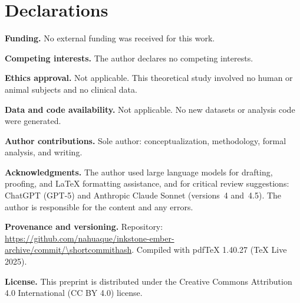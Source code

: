 \documentclass[11pt]{article}
\theoremstyle{upright}
\newcommand{\horizon}{\Lambda}
\newcommand{\commiturl}{\url{https://github.com/nahuaque/inkstone-ember-archive/commit/\shortcommithash}}
\begin{document}


\section*{Declarations}

\noindent\textbf{Funding.}
No external funding was received for this work.

\medskip
\noindent\textbf{Competing interests.}
The author declares no competing interests.

\medskip
\noindent\textbf{Ethics approval.}
Not applicable. This theoretical study involved no human or animal subjects and no clinical data.

\medskip
\noindent\textbf{Data and code availability.}
Not applicable. No new datasets or analysis code were generated.

\medskip
\noindent\textbf{Author contributions.}
Sole author: conceptualization, methodology, formal analysis, and writing.

\medskip
\noindent\textbf{Acknowledgments.}
The author used large language models for drafting, proofing, and \LaTeX{} formatting assistance, and for critical review suggestions: ChatGPT (GPT-5) and Anthropic Claude Sonnet (versions~4 and~4.5). 
The author is responsible for the content and any errors.

\medskip
\noindent\textbf{Provenance and versioning.}
Repository:\\ \commiturl. 
Compiled with pdf\TeX{} 1.40.27 (TeX Live 2025). 

\medskip
\noindent\textbf{License.}
This preprint is distributed under the Creative Commons Attribution 4.0 International (CC BY 4.0) license.

\appendix
{} %
\end{document}
